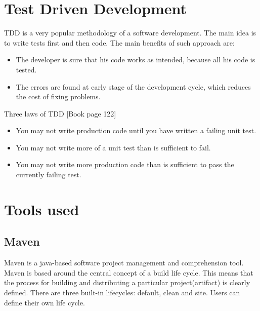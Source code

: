   \section{Test Driven Development}
  TDD is a very popular methodology of a software development. The main idea is
  to write tests first and then code. The main benefits of such approach are:
      \begin{itemize}
        \item The developer is sure that his code works as intended, because all
        his code is tested.
        \item The errors are found at early stage of the development cycle, which
        reduces the cost of fixing problems.
      \end{itemize}
      
      Three laws of TDD \cite[pp122]{cleancode}[Book page 122]
        \begin{itemize}
          \item You may not write production code until you have written a failing unit test.
          \item You may not write more of a unit test than is sufficient to fail.
          \item You may not write more production code than is sufficient to pass the currently failing test.
        \end{itemize}
        
  \section {Tools used}
  \label{sec:toolsused}
  
  \subsection{Maven}
  Maven is a java-based software project management and comprehension tool.
  Maven is based around the central concept of a build life cycle. This means
  that the process for building and distributing a particular project(artifact) is clearly defined. There are three built-in lifecycles:
  default, clean and site. Users can define their own life cycle. 
  
